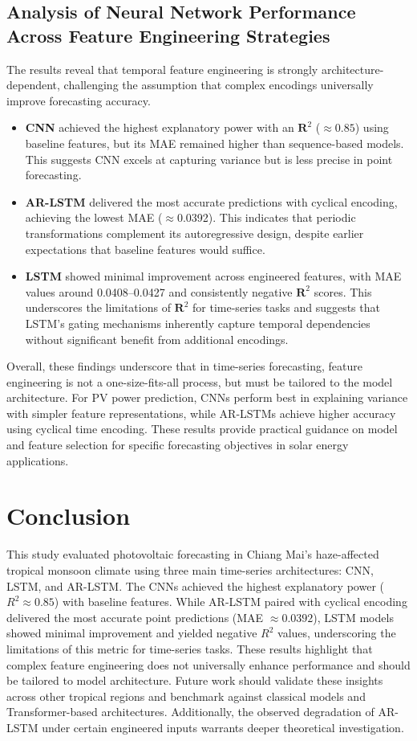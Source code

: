 \documentclass[conference]{IEEEtran}
\begin{document}
	\subsection{Analysis of Neural Network Performance Across Feature Engineering Strategies}
	The results reveal that temporal feature engineering is strongly architecture-dependent, challenging the assumption that complex encodings universally improve forecasting accuracy.
	\begin{itemize}
		\item \textbf{CNN} achieved the highest explanatory power with an $\mathbf{R}^{2}$ ($\approx0.85$) using baseline features, but its MAE remained higher than sequence-based models. This suggests CNN excels at capturing variance but is less precise in point forecasting.
		\item \textbf{AR-LSTM} delivered the most accurate predictions with cyclical encoding, achieving the lowest MAE ($\approx$0.0392). This indicates that periodic transformations complement its autoregressive design, despite earlier expectations that baseline features would suffice.
		\item \textbf{LSTM} showed minimal improvement across engineered features, with MAE values around 0.0408–0.0427 and consistently negative $\mathbf{R}^{2}$ scores. This underscores the limitations of $\mathbf{R}^{2}$ for time-series tasks and suggests that LSTM’s gating mechanisms inherently capture temporal dependencies without significant benefit from additional encodings.
	\end{itemize}
	
	Overall, these findings underscore that in time-series forecasting, feature engineering is not a one-size-fits-all process, but must be tailored to the model architecture. For PV power prediction, CNNs perform best in explaining variance with simpler feature representations, while AR-LSTMs achieve higher accuracy using cyclical time encoding. These results provide practical guidance on model and feature selection for specific forecasting objectives in solar energy applications.
	
	\section{Conclusion}
	
	This study evaluated photovoltaic forecasting in Chiang Mai’s haze-affected tropical monsoon climate using three main time-series architectures: CNN, LSTM, and AR-LSTM. The CNNs achieved the highest explanatory power  ($R^{2} \approx\allowbreak 0.85$) with baseline features. While AR-LSTM paired with cyclical encoding delivered the most accurate point predictions (MAE $\approx\allowbreak 0.0392$), LSTM models showed minimal improvement and yielded negative $R^2$ values, underscoring the limitations of this metric for time-series tasks. These results highlight that complex feature engineering does not universally enhance performance and should be tailored to model architecture. Future work should validate these insights across other tropical regions and benchmark against classical models and Transformer-based architectures. Additionally, the observed degradation of AR-LSTM under certain engineered inputs warrants deeper theoretical investigation.

	
	\balance
	
	
	
	
\end{document}
